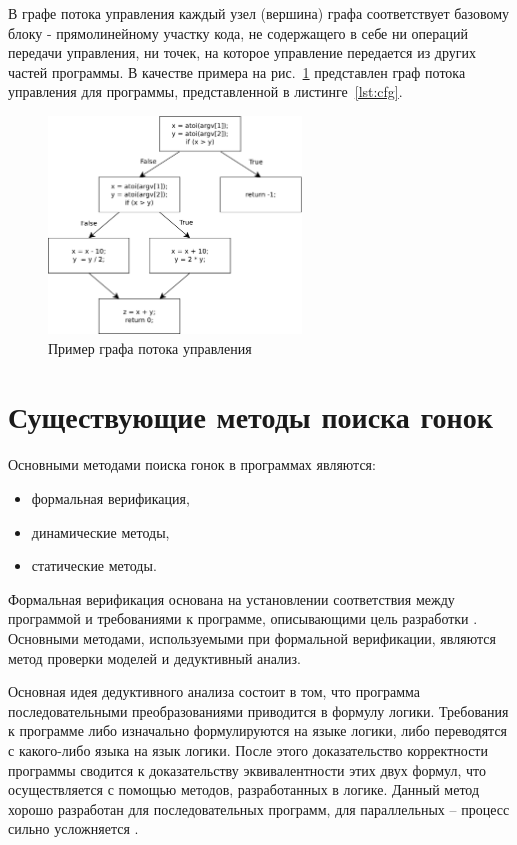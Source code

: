 В графе потока управления каждый узел (вершина) графа соответствует базовому блоку - прямолинейному участку кода, не содержащего в себе ни операций передачи управления, ни точек, на которое управление передается из других частей программы. В качестве примера на рис.~\ref{fig:cfg-example} представлен граф потока
управления для программы, представленной в листинге~\ref{lst:cfg}.



\begin{figure}
  \centering
  \includegraphics[width=0.6\textwidth]{inc/dia/cfg-example}
  \caption{Пример графа потока управления}
  \label{fig:cfg-example}
\end{figure}

\section{Существующие методы поиска гонок}

Основными методами поиска гонок в программах являются:

\begin{itemize}
  \item формальная верификация,
  \item динамические методы,
  \item статические методы.
\end{itemize}

Формальная верификация основана на установлении соответствия между программой и требованиями к программе, описывающими цель разработки \cite{Kropacheva}. Основными методами, используемыми при формальной верификации, являются метод проверки моделей и дедуктивный анализ.

Основная идея дедуктивного анализа состоит в том, что программа  последовательными преобразованиями приводится в формулу логики. Требования к программе либо изначально формулируются на языке логики, либо переводятся с какого-либо языка на язык логики. После этого доказательство корректности программы сводится к доказательству эквивалентности этих двух формул, что осуществляется с помощью методов, разработанных в логике. Данный метод хорошо разработан для последовательных программ, для параллельных – процесс сильно усложняется \cite{Kropacheva}.

